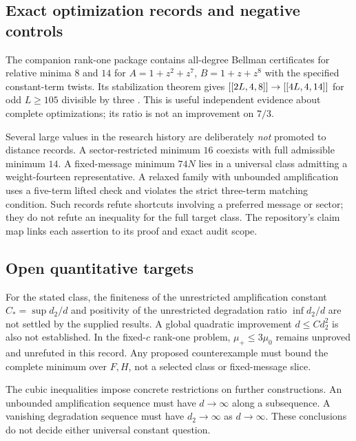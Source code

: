 \subsection{Exact optimization records and negative controls}
The companion rank-one package contains all-degree Bellman certificates for relative minima $8$ and $14$ for $A=1+z^2+z^7$, $B=1+z+z^8$ with the specified constant-term twists. Its stabilization theorem gives $[[2L,4,8]]\to[[4L,4,14]]$ for odd $L\ge105$ divisible by three \cite{RankOneNote}. This is useful independent evidence about complete optimizations; its ratio is not an improvement on $7/3$.

Several large values in the research history are deliberately \emph{not} promoted to distance records. A sector-restricted minimum $16$ coexists with full admissible minimum $14$. A fixed-message minimum $74N$ lies in a universal class admitting a weight-fourteen representative. A relaxed family with unbounded amplification uses a five-term lifted check and violates the strict three-term matching condition. Such records refute shortcuts involving a preferred message or sector; they do not refute an inequality for the full target class. The repository's claim map links each assertion to its proof and exact audit scope.

\subsection{Open quantitative targets}
For the stated class, the finiteness of the unrestricted amplification constant $C_*=\sup d_2/d$ and positivity of the unrestricted degradation ratio $\inf d_2/d$ are not settled by the supplied results. A global quadratic improvement $d\le C d_2^2$ is also not established. In the fixed-$c$ rank-one problem, $\mu_+\le3\mu_0$ remains unproved and unrefuted in this record. Any proposed counterexample must bound the complete minimum over $F,H$, not a selected class or fixed-message slice.

The cubic inequalities impose concrete restrictions on further constructions. An unbounded amplification sequence must have $d\to\infty$ along a subsequence. A vanishing degradation sequence must have $d_2\to\infty$ as $d\to\infty$. These conclusions do not decide either universal constant question.
